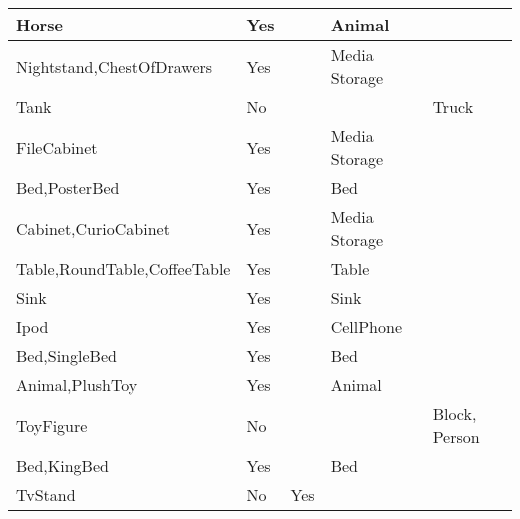\documentclass{article}
\begin{document}
\begin{longtable}{|l|l|l|l|l|}
Horse                                    & Yes              &                                & Animal         &                             \\ \hline
Nightstand,ChestOfDrawers                & Yes              &                                & Media Storage  &                             \\ \hline
Tank                                     & No               &                                &                & Truck                       \\ \hline
FileCabinet                              & Yes              &                                & Media Storage  &                             \\ \hline
Bed,PosterBed                            & Yes              &                                & Bed            &                             \\ \hline
Cabinet,CurioCabinet                     & Yes              &                                & Media Storage  &                             \\ \hline
Table,RoundTable,CoffeeTable             & Yes              &                                & Table          &                             \\ \hline
Sink                                     & Yes              &                                & Sink           &                             \\ \hline
Ipod                                     & Yes              &                                & CellPhone      &                             \\ \hline
Bed,SingleBed                            & Yes              &                                & Bed            &                             \\ \hline
Animal,PlushToy                          & Yes              &                                & Animal         &                             \\ \hline
ToyFigure                                & No               &                                &                & Block, Person               \\ \hline
Bed,KingBed                              & Yes              &                                & Bed            &                             \\ \hline
TvStand                                  & No               & Yes                            &                &                             \\ \hline

\end{longtable}
\end{document}
